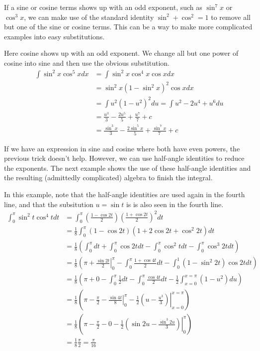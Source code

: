 \documentclass[fleqn]{report}
\begin{document}
If a sine or cosine terms shows up with an odd exponent, such
as $\sin^7 x$ or $\cos^3 x$, we can make use of the standard
identity $\sin^2 + \cos^2 =1$ to remove all but one of the
sine or cosine terms. This can be a way to make more
complicated examples into easy substitutions.

\begin{example}
Here cosine shows up with an odd exponent. We change all
but one power of cosine into sine and then use the obvious
substitution.
\begin{align*}
\int \sin^2 x \cos^5 x dx & = \int \sin^2 x \cos^4 x \cos x dx
\\
& = \sin^2 x (1-\sin^2 x)^2 \cos x dx \\
& = \int u^2 (1-u^2)^2 du = \int u^2 - 2u^4 + u^6 du \\
& = \frac{u^3}{3} - \frac{2u^5}{5} + \frac{u^7}{7} + c \\
& = \frac{\sin^3 x}{3} - \frac{2\sin^5 x}{5} + \frac{\sin^7
x}{7} + c
\end{align*}
\end{example}

If we have an expression in sine and cosine where both have
even powers, the previous trick doesn't help. However, we can
use half-angle identities to reduce the exponents. The next
example shows the use of these half-angle identities and the
resulting (admittedly complicated) algebra to finish the
integral. 

\begin{example}
In this example, note that the half-angle identities are used again
in the fourth line, and that the subsitution $u = \sin t$ is
is also seen in the fourth line.
\begin{align*}
\int_0^\pi \sin^2 t \cos^4 t dt & = \int_0^\pi \left(
\frac{1-\cos2t}{2} \right) \left( \frac{1 + \cos2t}{2} \right)^2
dt \\
& = \frac{1}{8} \int_0^\pi (1-\cos 2t) (1+ 2 \cos 2t + \cos^2
2t) dt \\
& = \frac{1}{8} \left( \int_0^\pi dt + \int_0^\pi \cos 2t dt -
\int_0^\pi \cos^2 t dt - \int_0^\pi \cos^3 2t dt \right) \\
& = \frac{1}{8} \left( \pi + \left. \frac{\sin 2t}{2}
\right|_0^\pi - \int_0^\pi \frac{1 + \cos 4t}{2} dt - \int_0^1
(1-\sin^2 2t) \cos 2t dt \right) \\
& = \frac{1}{8} \left( \pi + 0 - \int_0^\pi \frac{1}{2} dt -
\int_0^\pi \frac{\cos 4t}{2}dt - \frac{1}{2} \int_{x=0}^{x=\pi}
(1-u^2) du \right) \\
& = \frac{1}{8} \left( \pi - \frac{\pi}{2} - \left. \frac{\sin
4t}{8} \right|_0^\pi - \left. \frac{1}{2} \left( u -
\frac{u^3}{3} \right) \right|_{x=0}^{x=\pi} \right) \\
& = \frac{1}{8} \left( \pi - \frac{\pi}{2} - 0 - \frac{1}{2}
\left. \left( \sin 2u - \frac{\sin^3 2u}{3} \right)
\right|_0^\pi \right) \\
& = \frac{1}{8} \frac{\pi}{2} = \frac{\pi}{16}
\end{align*}
\end{example}
\end{document}
